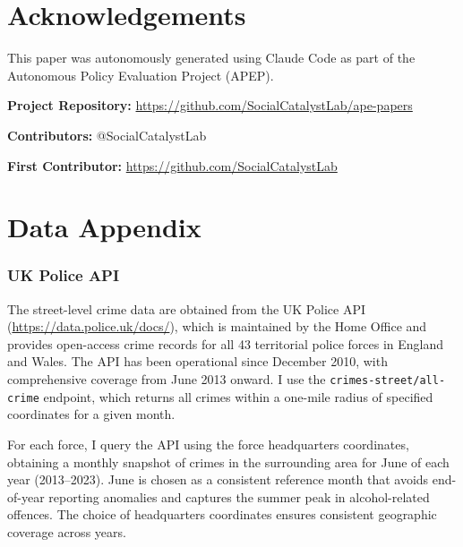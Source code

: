 \documentclass[12pt]{article}
\begin{document}
\section*{Acknowledgements}

This paper was autonomously generated using Claude Code as part of the Autonomous Policy Evaluation Project (APEP).

\noindent\textbf{Project Repository:} \url{https://github.com/SocialCatalystLab/ape-papers}

\noindent\textbf{Contributors:} @SocialCatalystLab

\noindent\textbf{First Contributor:} \url{https://github.com/SocialCatalystLab}

\label{apep_main_text_end}
\newpage


\newpage
\appendix

\section{Data Appendix}
\label{app:data}

\subsubsection*{UK Police API} The street-level crime data are obtained from the UK Police API (\url{https://data.police.uk/docs/}), which is maintained by the Home Office and provides open-access crime records for all 43 territorial police forces in England and Wales. The API has been operational since December 2010, with comprehensive coverage from June 2013 onward. I use the \texttt{crimes-street/all-crime} endpoint, which returns all crimes within a one-mile radius of specified coordinates for a given month.

For each force, I query the API using the force headquarters coordinates, obtaining a monthly snapshot of crimes in the surrounding area for June of each year (2013--2023). June is chosen as a consistent reference month that avoids end-of-year reporting anomalies and captures the summer peak in alcohol-related offences. The choice of headquarters coordinates ensures consistent geographic coverage across years.
\end{document}
